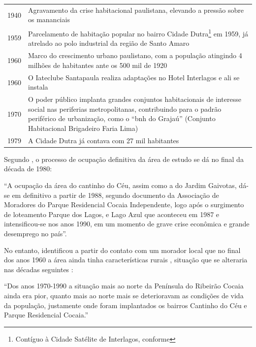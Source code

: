 \begin{center}
\begin{longtable}{|l|p{12cm}|}
			1940 & Agravamento da crise habitacional paulistana, elevando a pressão sobre os mananciais \\
			1959 & Parcelamento de habitação popular no bairro Cidade Dutra\footnote{Contíguo à Cidade Satélite de Interlagos, conforme \citeonline[p.51]{Francca2000}} em 1959, já atrelado ao polo industrial da região de Santo Amaro \\
			1960 & Marco do crescimento urbano paulistano, com a população atingindo 4 milhões de habitantes ante os 500 mil de 1920 \\
			1960 & O Iateclube Santapaula realiza adaptações no Hotel Interlagos e ali se instala \cite[p.52]{Francca2000} \\
			1970 & O poder público implanta grandes conjuntos habitacionais de interesse social nas periferias metropolitanas, contribuindo para o padrão periférico de urbanização, como o ``\gls{bnh} do Grajaú'' (Conjunto Habitacional Brigadeiro Faria Lima) \\
			1979 & A Cidade Dutra já contava com 27 mil habitantes \cite[p.51]{Francca2000} \\
		\end{longtable}
	\end{center}
	
	Segundo , o processo de ocupação definitiva da área de estudo se dá no final da década de 1980:
		
	\begin{citacao}
		``A ocupação da área do cantinho do Céu, assim como a do Jardim Gaivotas, dá-se em definitivo a partir de 1988, segundo documento da Associação de Moradores do Parque Residencial Cocaia Independente, logo após o surgimento de loteamento Parque dos Lagos, e Lago Azul que aconteceu em 1987 e intensificou-se nos anos 1990, em um momento de grave crise econômica e grande desemprego no país''.
	\end{citacao}

	No entanto,  identificou a partir do contato com um morador local que no final dos anos 1960 a área ainda tinha características rurais \cite[p.80]{Silva2016}, situação que se alteraria nas décadas seguintes \cite[p.82]{Silva2016}:
	
	\begin{citacao}
		``Dos anos 1970-1990 a situação mais ao norte da Península do Ribeirão Cocaia ainda era pior, quanto mais ao norte mais se deterioravam as condições de vida da população, justamente onde foram implantados os bairros Cantinho do Céu e Parque Residencial Cocaia.''
	\end{citacao}
	
